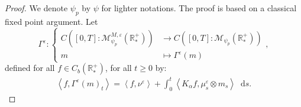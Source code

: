 \documentclass[11pt,a4paper]{article}
\newcommand{\RR}{\mathbb{R}}
\newcommand{\RRP}{\mathbb{R}^+_*}
\newcommand{\MC}{\mathcal{M}}
\newcommand{\brac}[1]{\left\langle#1\right\rangle}
\newcommand{\dd}{\mathop{}\!\mathrm{d}}
\begin{document}
\begin{proof}
    We denote $\psi_p$ by $\psi$ for lighter notations. The proof is based on a classical fixed point argument. Let 
    \[ \Gamma^\varepsilon : 
    \left\lbrace 
    \begin{aligned}
        C\left([0,T]:\MC^{M,\varepsilon}_{\psi_p}\left(\RRP\right) \right) &\to C\left([0,T]:\MC_{\psi_p}\left(\RRP\right) \right)\\
         m & \mapsto \Gamma^\varepsilon(m)
    \end{aligned}
    \right.,
    \]
    defined for all $f \in C_b\left( \RR_*^+\right)$, for all $t \geq 0$ by:
    \begin{align*}
        \brac{f,\Gamma^\varepsilon(m)_t} = \brac{f,\nu^\varepsilon} + \int_0^t \brac{K_\alpha f,\mu^\varepsilon_s\otimes m_s} \dd s.
    \end{align*}


\end{proof}
\end{document}
